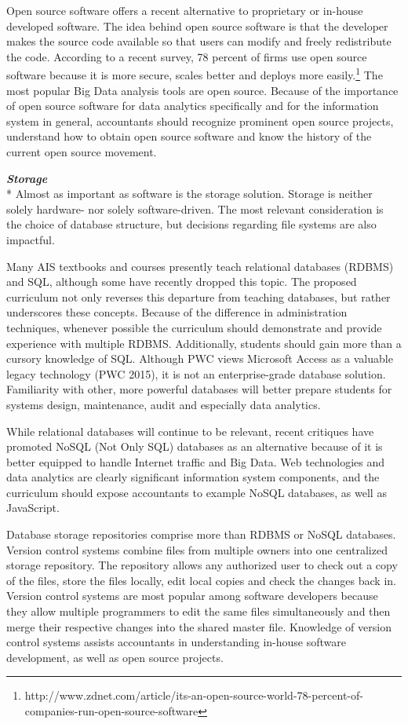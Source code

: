 \documentclass[12pt]{article}
\newcommand{\SubSubSection}[1]{{\centering{}\normalsize{}\textbf{\emph{#1}}}\\*\indent{}}
\begin{document}
Open source software offers a recent alternative to proprietary or in-house developed software. The idea behind open source software is that the developer makes the source code available so that users can modify and freely redistribute the code. According to a recent survey, 78 percent of firms use open source software because it is more secure, scales better and deploys more easily.\footnote{http://www.zdnet.com/article/its-an-open-source-world-78-percent-of-companies-run-open-source-software} The most popular Big Data analysis tools are open source. Because of the importance of open source software for data analytics specifically and for the information system in general, accountants should recognize prominent open source projects, understand how to obtain open source software and know the history of the current open source movement.

\SubSubSection{Storage}
Almost as important as software is the storage solution. Storage is neither solely hardware- nor solely software-driven. The most relevant consideration is the choice of database structure, but decisions regarding file systems are also impactful.

Many AIS textbooks and courses presently teach relational databases (RDBMS) and SQL, although some have recently dropped this topic. The proposed curriculum not only reverses this departure from teaching databases, but rather underscores these concepts. Because of the difference in administration techniques, whenever possible the curriculum should demonstrate and provide experience with multiple RDBMS. Additionally, students should gain more than a cursory knowledge of SQL. Although PWC views Microsoft Access as a valuable legacy technology (PWC 2015), it is not an enterprise-grade database solution. Familiarity with other, more powerful databases will better prepare students for systems design, maintenance, audit and especially data analytics.

While relational databases will continue to be relevant, recent critiques have promoted NoSQL (Not Only SQL) databases as an alternative because of it is better equipped to handle Internet traffic and Big Data. Web technologies and data analytics are clearly significant information system components, and the curriculum should expose accountants to example NoSQL databases, as well as JavaScript.

Database storage repositories comprise more than RDBMS or NoSQL databases. Version control systems combine files from multiple owners into one centralized storage repository. The repository allows any authorized user to check out a copy of the files, store the files locally, edit local copies and check the changes back in. Version control systems are most popular among software developers because they allow multiple programmers to edit the same files simultaneously and then merge their respective changes into the shared master file. Knowledge of version control systems assists accountants in understanding in-house software development, as well as open source projects.
\end{document}
